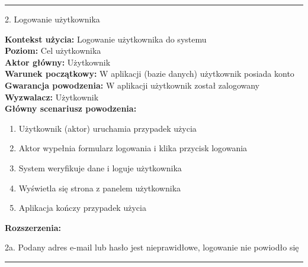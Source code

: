\noindent\rule{14cm}{0.1pt} %

{\noindent \bf{\small 2. Logowanie użytkownika\par}}
\vspace{0.5cm}
{\noindent \bf Kontekst użycia: } Logowanie użytkownika do systemu\\
{\bf Poziom: } Cel użytkownika\\
{\bf Aktor główny: } Użytkownik\\
{\bf Warunek początkowy: } W aplikacji (bazie danych) użytkownik posiada konto\\
{\bf Gwarancja powodzenia: } W aplikacji użytkownik został zalogowany\\
{\bf Wyzwalacz: } Użytkownik\\
{\bf Główny scenariusz powodzenia: }
\begin{center}
    \begin{enumerate}
        \item Użytkownik (aktor) uruchamia przypadek użycia
        \item Aktor wypełnia formularz logowania i klika przycisk logowania
        \item System weryfikuje dane i loguje użytkownika
        \item Wyświetla się strona z panelem użytkownika
        \item Aplikacja kończy przypadek użycia
    \end{enumerate}
\end{center}
{\noindent \bf Rozszerzenia: }
\begin{center}
    \begin{description}
        \item{2a.} Podany adres e-mail lub hasło jest nieprawidłowe, logowanie nie powiodło się
    \end{description}
\end{center}

\noindent\rule{14cm}{0.1pt} %

